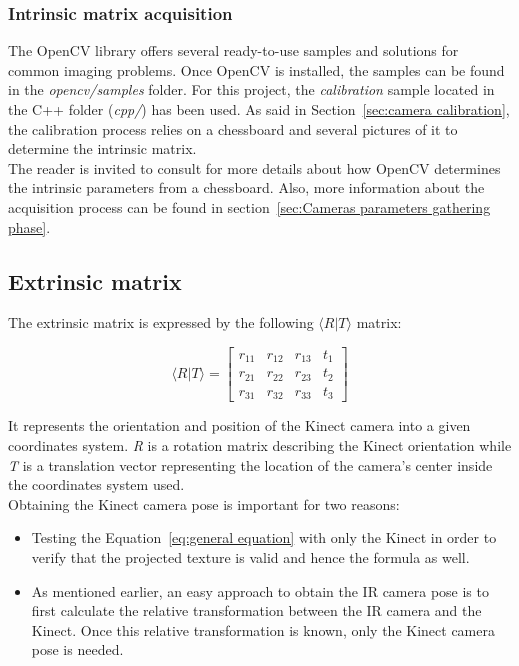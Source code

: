 \subsubsection{Intrinsic matrix acquisition}
\label{sec:intrinsic acquisition}

The OpenCV library offers several ready-to-use samples and solutions for common imaging problems. Once OpenCV is installed, the samples can be found in the \textit{opencv/samples} folder. For this project, the \textit{calibration} sample located in the C++ folder (\textit{cpp/}) has been used. As said in Section~\ref{sec:camera calibration}, the calibration process relies on a chessboard and several pictures of it to determine the intrinsic matrix.\\

The reader is invited to consult \cite{zhang_flexible_1999} for more details about how OpenCV determines the intrinsic parameters from a chessboard. Also, more information about the acquisition process can be found in section~\ref{sec:Cameras parameters gathering phase}.


\subsection{Extrinsic matrix}

The extrinsic matrix is expressed by the following $\langle R\vert T\rangle$ matrix:

\begin{equation}
\label{eq:extrinsic}
\langle R\vert T\rangle =  \begin{bmatrix}
       r_{11} & r_{12} & r_{13} & t_1 \\
       r_{21} & r_{22} & r_{23} & t_2\\
       r_{31} & r_{32} & r_{33} & t_3
     \end{bmatrix}
\end{equation}  


It represents the orientation and position of the Kinect camera into a given coordinates system. \textit{R} is a rotation matrix describing the Kinect orientation while \textit{T} is a translation vector representing the location of the camera's center inside the coordinates system used.\\

Obtaining the Kinect camera pose is important for two reasons: 

\begin{itemize}
  \item Testing the Equation~\ref{eq:general equation} with only the Kinect in order to verify that the projected texture is valid and hence the formula as well.
  \item As mentioned earlier, an easy approach to obtain the IR camera pose is to first calculate the relative transformation between the IR camera and the Kinect. Once this relative transformation is known, only the Kinect camera pose is needed. 
\end{itemize}

